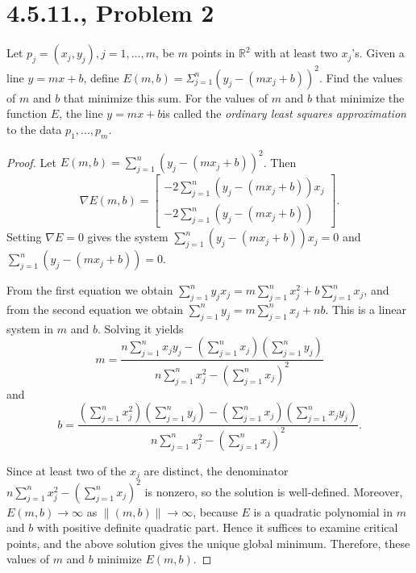 \documentclass{article}
\begin{document}
\section*{4.5.11., Problem 2}
Let $p_j = (x_j , y_j ), j = 1, ..., m$, be $m$ points in $\mathbb{R}^2$ with at least two $x_j$'s. Given a line $y = mx + b$, define $E(m, b) = \Sigma_{j=1}^n(y_j - (mx_j + b))^2$. Find the values of $m$ and $b$ that minimize this sum. For
the values of $m$ and $b$ that minimize the function $E$, the line $y = mx + b $is called the \textit{ordinary least squares approximation} to the data $p_1, . . . , p_m$.
\begin{proof}
Let $E(m,b)=\sum_{j=1}^n (y_j-(mx_j+b))^2$. Then 
\[
\nabla E(m,b)=\begin{bmatrix}
-2\sum_{j=1}^n (y_j-(mx_j+b))x_j \\
-2\sum_{j=1}^n (y_j-(mx_j+b))
\end{bmatrix}.
\]
Setting $\nabla E=0$ gives the system 
$\sum_{j=1}^n (y_j-(mx_j+b))x_j=0$ and $\sum_{j=1}^n (y_j-(mx_j+b))=0$. 

From the first equation we obtain $\sum_{j=1}^n y_j x_j = m\sum_{j=1}^n x_j^2 + b\sum_{j=1}^n x_j$, and from the second equation we obtain $\sum_{j=1}^n y_j = m\sum_{j=1}^n x_j + nb$. This is a linear system in $m$ and $b$. Solving it yields 
\[
m=\frac{n\sum_{j=1}^n x_j y_j - \left(\sum_{j=1}^n x_j\right)\left(\sum_{j=1}^n y_j\right)}{n\sum_{j=1}^n x_j^2 - \left(\sum_{j=1}^n x_j\right)^2}
\]
and 
\[
b=\frac{\left(\sum_{j=1}^n x_j^2\right)\left(\sum_{j=1}^n y_j\right) - \left(\sum_{j=1}^n x_j\right)\left(\sum_{j=1}^n x_j y_j\right)}{n\sum_{j=1}^n x_j^2 - \left(\sum_{j=1}^n x_j\right)^2}.
\]

Since at least two of the $x_j$ are distinct, the denominator $n\sum_{j=1}^n x_j^2 - (\sum_{j=1}^n x_j)^2$ is nonzero, so the solution is well-defined. Moreover, $E(m,b)\to\infty$ as $\|(m,b)\|\to\infty$, because $E$ is a quadratic polynomial in $m$ and $b$ with positive definite quadratic part. Hence it suffices to examine critical points, and the above solution gives the unique global minimum. Therefore, these values of $m$ and $b$ minimize $E(m,b)$.
\end{proof}

\clearpage
\end{document}

